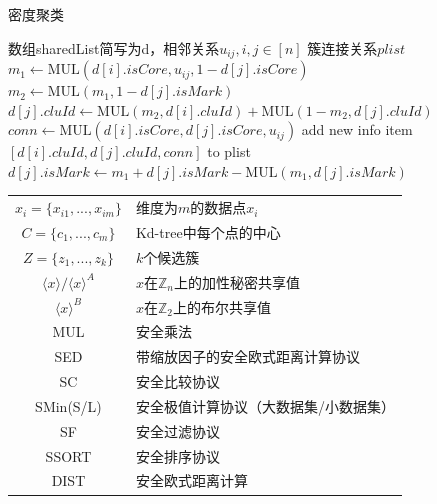 \documentclass[12pt, a4paper, oneside]{ctexart}
\begin{document}
\begin{algorithm}[htbp]
	\renewcommand{\algorithmicrequire}{\textbf{输入:}}
	\renewcommand{\algorithmicensure}{\textbf{输出:}}
	\caption{密度聚类}
	\label{alg_t1_s2}
	\begin{algorithmic}[1]
		\REQUIRE 数组sharedList简写为d，相邻关系$ u_{ij},i,j\in[n] $
		\ENSURE 簇连接关系$ plist $
		\STATE $ m_1 \leftarrow \text{MUL}(d[i].isCore, u_{ij}, 1-d[j].isCore) $
		\STATE $ m_2 \leftarrow \text{MUL}(m_1, 1-d[j].isMark) $
		\STATE $ d[j].cluId \leftarrow  \text{MUL}(m_2, d[i].cluId) + \text{MUL}(1-m_2, d[j].cluId)$
		\STATE $ conn \leftarrow \text{MUL}(d[i].isCore, d[j].isCore, u_{ij}) $
		\STATE add new info item $ [d[i].cluId, d[j].cluId, conn] $ to plist
		\STATE $ d[j].isMark \leftarrow m_1 + d[j].isMark - \text{MUL}(m_1, d[j].isMark) $
		\ENDFOR
		\ENDFOR
	\end{algorithmic}
\end{algorithm}

\begin{tabular}{c|l}
	$ x_i =\{x_{i1},...,x_{im}\} $ & 维度为$ m $的数据点$ x_i $\\
	$ C = \{c_1,...,c_m\} $& Kd-tree中每个点的中心\\
	$ Z = \{z_1,...,z_k\} $& $ k $个候选簇\\
	$ \langle x \rangle/\langle x \rangle^A $& $ x $在$ \mathbb{Z}_n $上的加性秘密共享值\\
	$ \langle x \rangle^B $& $ x $在$ \mathbb{Z}_2 $上的布尔共享值\\
	MUL & 安全乘法\\
	SED & 带缩放因子的安全欧式距离计算协议\\
	SC & 安全比较协议\\
	SMin(S/L) & 安全极值计算协议（大数据集/小数据集）\\
	SF & 安全过滤协议\\
	SSORT & 安全排序协议\\
	DIST & 安全欧式距离计算\\
	
\end{tabular}
\end{document}
